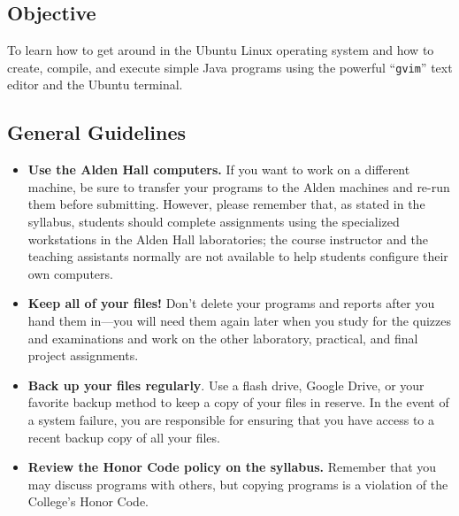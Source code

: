 



\subsection*{Objective}

To learn how to get around in the Ubuntu Linux operating system and how to create, compile, and execute simple Java
programs using the powerful ``{\tt gvim}'' text editor and the Ubuntu terminal.

\vspace*{-.1in}
\subsection*{General Guidelines}

\begin{itemize}
  \setlength{\itemsep}{0pt}

  \item {\bf Use the Alden Hall computers.} If you want to work on a different machine, be sure to transfer your
    programs to the Alden machines and re-run them before submitting. However, please remember that, as stated in the
    syllabus, students should complete assignments using the specialized workstations in the Alden Hall laboratories;
    the course instructor and the teaching assistants normally are not available to help students configure their own
    computers.

  \item {\bf Keep all of your files!} Don't delete your programs and reports after you hand them in---you will need
    them again later when you study for the quizzes and examinations and work on the other laboratory, practical, and
    final project assignments.

  \item {\bf Back up your files regularly}. Use a flash drive, Google Drive, or your favorite backup method to keep a
    copy of your files in reserve. In the event of a system failure, you are responsible for ensuring that you have
    access to a recent backup copy of all your files.

  \item {\bf Review the Honor Code policy on the syllabus.} Remember that you may discuss programs with others, but
    copying programs is a violation of the College's Honor Code.

\end{itemize}

